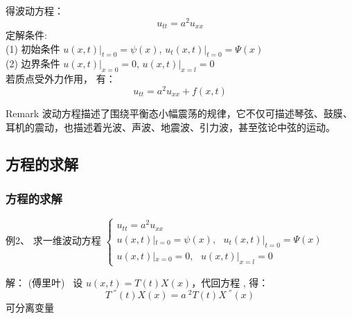 \begin{frame}
	\frametitle{}	
	得波动方程：
	\begin{equation*}
		u_{tt}=a^2u_{xx}
	\end{equation*}
	定解条件:\\
	(1) 初始条件 
	$\displaystyle  u(x,t)|_{t=0}= \psi (x) $, 	 $\displaystyle  u_t(x,t)|_{t=0}= \Psi (x) $\\
	(2) 边界条件
	$\displaystyle  u(x,t)|_{x=0}= 0 $, 	 $\displaystyle  u(x,t)|_{x=l}= 0 $\\ 	\vspace{0.3cm} 
	若质点受外力作用， 有：
	\begin{equation*}
		u_{tt}=a^2u_{xx} +f(x,t)
	\end{equation*}
	\begin{block} {Remark}
		波动方程描述了围绕平衡态小幅震荡的规律，它不仅可描述琴弦、鼓膜、耳机的震动，也描述着光波、声波、地震波、引力波，甚至弦论中弦的运动。
	\end{block}
\end{frame}	
\subsection{方程的求解}
\begin{frame}
	\frametitle{方程的求解}	
	\begin{exampleblock} {例2、	求一维波动方程}
	$\displaystyle \begin{cases}
		u_{tt}=a^2u_{xx}\\
		u(x,t)|_{t=0}= \psi (x) ,~~~ u_t(x,t)|_{t=0}= \Psi (x) \\
		u(x,t)|_{x=0}= 0, ~~~  u(x,t)|_{x=l}= 0 
	\end{cases}$ \\	
	\end{exampleblock} %
	\alert{解：} 	(傅里叶)   设 $\displaystyle  u(x,t)=T(t)X(x) $，代回方程 , 得：
	\begin{equation*}
		 T~^{''}(t)X(x) =a~^2 T(t)X~^{''}(x) 
	\end{equation*}
	 \hspace{1cm} 可分离变量
\end{frame}	

